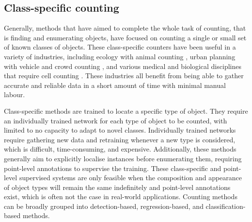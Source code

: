 \documentclass[../thesis.tex]{subfiles}
\begin{document}
\subsection{Class-specific counting}
Generally, methods that have aimed to complete the whole task of counting, that is finding and enumerating objects, have focused on counting a single or small set of known classes of objects.
These class-specific counters have been useful in a variety of industries, including ecology with animal counting \cite{go2021fine, arteta2016counting}, urban planning with vehicle \cite{arteta2014interactive, Lu18, mundhenk2016large} and crowd counting \cite{wang2011automatic, wang2015deep, marana1997estimation, cao2018scale, barinova2012detection, Lu18}, and various medical and biological disciplines that require cell counting \cite{xie2018microscopy, morelli2021automating}. 
These industries all benefit from being able to gather accurate and reliable data in a short amount of time with minimal manual labour.

Class-specific methods are trained to locate a specific type of object. They require an individually trained network for each type of object to be counted, with limited to no capacity to adapt to novel classes.
Individually trained networks require gathering new data and retraining whenever a new type is considered, which is difficult, time-consuming, and expensive.  
Additionally, these methods generally aim to explicitly localise instances before enumerating them, requiring point-level annotations to supervise the training. 
These class-specific and point-level supervised systems are only feasible when the composition and appearance of object types will remain the same indefinitely and point-level annotations exist, which is often not the case in real-world applications. 
Counting methods can be broadly grouped into detection-based, regression-based, and classification-based methods.
\end{document}
